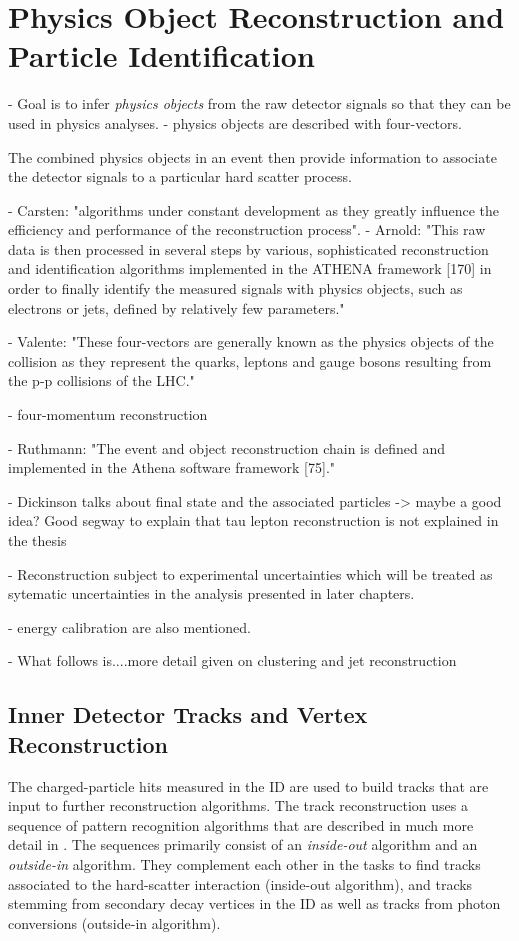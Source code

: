 
\chapter{Physics Object Reconstruction and Particle Identification}
\label{chap:objects}


- Goal is to infer \emph{physics objects} from the raw detector signals so that they can be used in physics analyses. 
- physics objects are described with four-vectors.

The combined physics objects in an event then provide information to associate the detector signals to a particular hard scatter process. 

- Carsten: "algorithms under constant development as they greatly influence the efficiency and performance of the reconstruction process".
- Arnold: "This raw data is then processed in several steps by various, sophisticated reconstruction and identification algorithms implemented in the ATHENA framework [170] in order to finally identify the measured signals with physics objects, such as electrons or jets, defined by relatively few parameters."

- Valente: "These four-vectors are generally known as the physics objects of the collision as they represent the quarks, leptons and gauge bosons resulting from the p-p collisions of the LHC."

- four-momentum reconstruction

- Ruthmann: "The event and object reconstruction chain is defined and implemented in the Athena software framework [75]."

- Dickinson talks about final state and the associated particles -> maybe a good idea? Good segway to explain that tau lepton reconstruction is not explained in the thesis

- Reconstruction subject to experimental uncertainties which will be treated as sytematic uncertainties in the analysis presented in later chapters.

- energy calibration are also mentioned.

- What follows is....more detail given on clustering and jet reconstruction

\section{Inner Detector Tracks and Vertex Reconstruction}
The charged-particle hits measured in the ID are used to build tracks that are input to further reconstruction algorithms. 
The track reconstruction uses a sequence of pattern recognition algorithms that are described in much more detail in . The sequences primarily consist of an \emph{inside-out} algorithm and an \emph{outside-in} algorithm. They complement each other in the tasks to find tracks associated to the hard-scatter interaction (inside-out algorithm), and tracks stemming from secondary decay vertices in the ID as well as tracks from photon conversions (outside-in algorithm).

